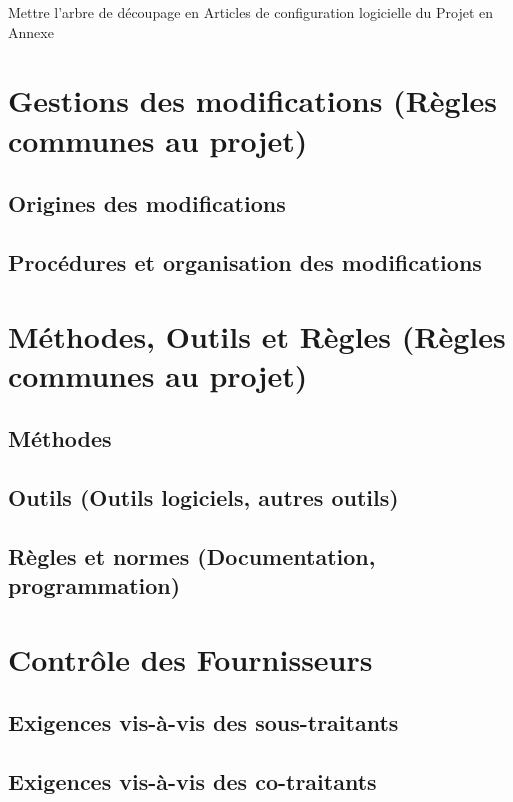 \documentclass[a4paper]{article}
\begin{document}
Mettre l'arbre de découpage en Articles de configuration logicielle du Projet en Annexe

\section{Gestions des modifications (Règles communes au projet)}

\subsection{Origines des modifications}

\subsection{Procédures et organisation des modifications}

\section{Méthodes, Outils et Règles (Règles communes au projet)}

\subsection{Méthodes}

\subsection{Outils (Outils logiciels, autres outils)}

\subsection{Règles et normes (Documentation, programmation)}

\section{Contrôle des Fournisseurs}

\subsection{Exigences vis-à-vis des sous-traitants}

\subsection{Exigences vis-à-vis des co-traitants}
\end{document}
